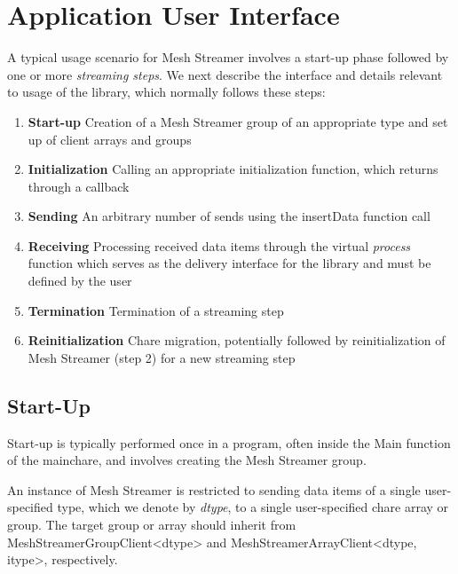 \section{Application User Interface}

A typical usage scenario for Mesh Streamer involves a start-up phase
followed by one or more \emph{streaming steps}. We next describe the
interface and details relevant to usage of the library, which normally
follows these steps:
 
\begin{enumerate}
\item{\textbf{Start-up}} Creation of a Mesh Streamer group of an
  appropriate type and set up of client arrays and groups
\item{\textbf{Initialization}} Calling an appropriate initialization
  function, which returns through a callback
\item{\textbf{Sending}} An arbitrary number of sends using the
  insertData function call
\item{\textbf{Receiving}} Processing received data items through the
  virtual \emph{process} function which serves as the delivery
  interface for the library and must be defined by the user
\item{\textbf{Termination}} Termination of a streaming step
\item{\textbf{Reinitialization}} Chare migration, potentially followed
  by reinitialization of Mesh Streamer (step 2) for a new streaming step
\end{enumerate}

\subsection{Start-Up}

Start-up is typically performed once in a program, often inside the
Main function of the mainchare, and involves creating the Mesh
Streamer group.

An instance of Mesh Streamer is restricted to sending data items of a
single user-specified type, which we denote by \emph{dtype}, to a
single user-specified chare array or group. The target group or array
should inherit from MeshStreamerGroupClient\textless{}dtype\textgreater{} and
MeshStreamerArrayClient\textless{}dtype, itype\textgreater{}, respectively.



